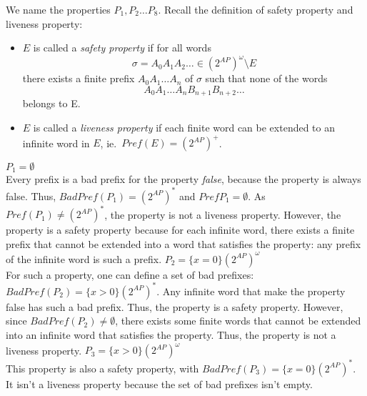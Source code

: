 \documentclass[11pt,a4paper]{article}
\newcommand\badp{\mathit{BadPref}}
\newcommand\pref{\mathit{Pref}}
\newcommand\twoap{2^{AP}}
\renewcommand\star{^*}
\begin{document}
\begin{Answer}


We name the properties $P_1, P_2\dots P_8$.
Recall the definition of safety property and liveness property:
\begin{itemize}
	\item $E$ is called a \emph{safety property} if for all words
		$$\sigma = A_0A_1A_2\dots\in{(\twoap)}^\omega\setminus E$$
		there exists a finite prefix $A_0A_1\dots A_n$ of $\sigma$ such that none of the words $$A_0A_1\dots A_nB_{n+1}B_{n+2}\dots$$ belongs to E. %
	\item $E$ is called a \emph{liveness property} if each finite word can be extended to an infinite word in $E$, ie.\ $\pref(E) = {(\twoap)}^+$.
\end{itemize}
  \Question%
  $P_1 = \emptyset$\\
Every prefix is a bad prefix for the property \textit{false}, because the property is always false. Thus, $\badp(P_1) = (\twoap)\star$ and $\pref{P_1} = \emptyset$. As $\pref(P_1)\neq (\twoap)\star$, the property is not a liveness property. However, the property is a safety property because for each infinite word, there exists a finite prefix that cannot be extended into a word that satisfies the property: any prefix of the infinite word is such a prefix. %
  \Question%
  $P_2 = \{x = 0\}(\twoap)^\omega$\\
For such a property, one can define a set of bad prefixes: $\badp(P_2) = \{x > 0\}(\twoap)\star$. Any infinite word that make the property false has such a bad prefix. Thus, the property is a safety property. However, since $\badp(P_2)\neq\emptyset$, there exists some finite words that cannot be extended into an infinite word that satisfies the property. Thus, the property is not a liveness property.
  \Question%
  $P_3 =  \{x > 0\}(\twoap)^\omega$\\
This property is also a safety property, with $\badp(P_3) = \{x=0\}(\twoap)\star$. It isn't a liveness property because the set of bad prefixes isn't empty.

\end{Answer}
\end{document}

